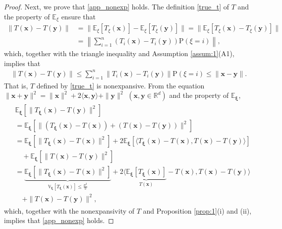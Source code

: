 \documentclass[smallextended,referee,envcountsect,]{svjour3}
\begin{document}
\begin{proof}
Next, we prove that \eqref{app_nonexp} holds. The definition \eqref{true_t} of $T$ and the property of $\mathbb{E}_\xi$ ensure that
\begin{align*}
\| T(\bm{x}) - T (\bm{y})  \|
&= 
\| \mathbb{E}_\xi [T_\xi (\bm{x}) ] - \mathbb{E}_\xi [T_\xi (\bm{y}) ] \|
= 
\| \mathbb{E}_\xi [T_\xi (\bm{x}) - T_\xi (\bm{y}) ] \|\\
&= 
\left\| \sum_{i=1}^n (T_i (\bm{x}) - T_i (\bm{y}) ) \mathrm{P}(\xi = i) \right\|,
\end{align*}
which, together with the triangle inequality and Assumption \ref{assum:1}(A1), implies that 
\begin{align}\label{nonexp_T}
\| T(\bm{x}) - T (\bm{y})  \|
\leq
\sum_{i=1}^n \| T_i (\bm{x}) - T_i (\bm{y}) \| \mathrm{P}(\xi = i)
\leq 
\| \bm{x} - \bm{y} \|.
\end{align}
That is, $T$ defined by \eqref{true_t} is nonexpansive. From the equation $\|\bm{x} + \bm{y}\|^2 = \|\bm{x}\|^2 + 2 \langle \bm{x},\bm{y} \rangle + \|\bm{y}\|^2$ $(\bm{x},\bm{y} \in \mathbb{R}^d)$ and the property of $\mathbb{E}_{\bm{\xi}}$,
\begin{align}\label{ineq:1}
\begin{split}
&\mathbb{E}_{\bm{\xi}} \left[ \| T_{\bm{\xi}}(\bm{x}) - T(\bm{y}) \|^2 \right]\\
&= 
\mathbb{E}_{\bm{\xi}} \left[ \| (T_{\bm{\xi}}(\bm{x}) - T(\bm{x})) 
+ (T(\bm{x}) - T (\bm{y})) \|^2 \right]\\
&=
\mathbb{E}_{\bm{\xi}} \left[ \| T_{\bm{\xi}}(\bm{x}) - T(\bm{x}) \|^2 \right]
+ 2 \mathbb{E}_{\bm{\xi}} \left[ \langle T_{\bm{\xi}}(\bm{x}) - T(\bm{x}),  T(\bm{x}) - T (\bm{y}) \rangle \right]\\
&\quad + 
\mathbb{E}_{\bm{\xi}} \left[ \| T(\bm{x}) - T (\bm{y})  \|^2 \right]\\
&= 
\underbrace{\mathbb{E}_{\bm{\xi}} \left[ \| T_{\bm{\xi}}(\bm{x}) - T(\bm{x}) \|^2 \right]}_{\mathbb{V}_{\bm{\xi}}[T_{\bm{\xi}}(\bm{x})] \leq \frac{\sigma^2}{b}}
+ 2  \langle \underbrace{\mathbb{E}_{\bm{\xi}} \left[ T_{\bm{\xi}}(\bm{x})\right]}_{T(\bm{x})} - T(\bm{x}),  T(\bm{x}) - T (\bm{y}) \rangle \\
&\quad + 
\| T(\bm{x}) - T (\bm{y})  \|^2,
\end{split} 
\end{align}
which, together with the nonexpansivity of $T$ and Proposition \ref{prop:1}(i) and (ii), implies that \eqref{app_nonexp} holds.


\end{proof}
\end{document}
